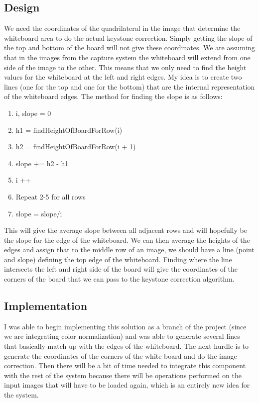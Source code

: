 \documentclass[]{article}
\begin{document}
		\subsection{Design}
			We need the coordinates of the quadrilateral in the image that determine the whiteboard area to do the actual keystone correction. Simply getting the slope of the top and bottom of the board will not give these coordinates. We are assuming that in the images from the capture system the whiteboard will extend from one side of the image to the other. This means that we only need to find the height values for the whiteboard at the left and right edges. My idea is to create two lines (one for the top and one for the bottom) that are the internal representation of the whiteboard edges. The method for finding the slope is as follows:
			\begin{enumerate}
				\item i, slope = 0
				\item h1 = findHeightOfBoardForRow(i)
				\item h2 = findHeightOfBoardForRow(i + 1)
				\item slope += h2 - h1
				\item i ++
				\item Repeat 2-5 for all rows
				\item slope = slope/i
			\end{enumerate}
			This will give the average slope between all adjacent rows and will hopefully be the slope for the edge of the whiteboard. We can then average the heights of the edges and assign that to the middle row of an image, we should have a line (point and slope) defining the top edge of the whiteboard. Finding where the line intersects the left and right side of the board will give the coordinates of the corners of the board that we can pass to the keystone correction algorithm.
			
		\subsection{Implementation}
			I was able to begin implementing this solution as a branch of the project (since we are integrating color normalization) and was able to generate several lines that basically match up with the edges of the whiteboard. The next hurdle is to generate the coordinates of the corners of the white board and do the image correction. Then there will be a bit of time needed to integrate this component with the rest of the system because there will be operations performed on the input images that will have to be loaded again, which is an entirely new idea for the system. 
			
\end{document}
